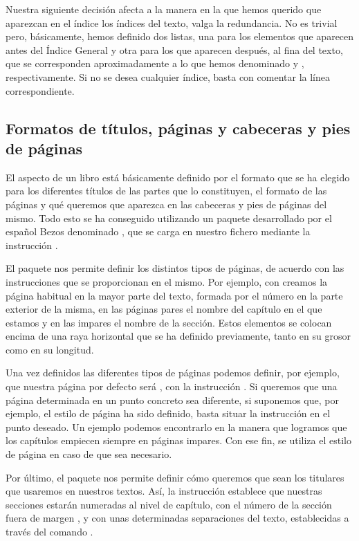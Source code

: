 Nuestra siguiente decisión afecta a la manera en la que hemos querido que aparezcan en el índice los índices del texto, valga la redundancia. No es trivial pero, básicamente, hemos definido dos listas, una para los elementos que aparecen antes del Índice General y otra para los  que aparecen después, al fina del texto, que se corresponden aproximadamente a lo que hemos denominado  y , respectivamente. Si no se desea cualquier índice, basta con comentar la línea correspondiente.

\subsection{Formatos de títulos, páginas y cabeceras y pies de páginas}
El aspecto de un libro está básicamente definido por el formato que se ha elegido para los diferentes títulos de las partes que lo constituyen, el formato de las páginas y qué queremos que aparezca en las cabeceras y pies de páginas del mismo. Todo esto se ha conseguido utilizando un paquete desarrollado por el español Bezos denominado , que se carga en nuestro fichero mediante la instrucción .

El paquete nos permite definir los distintos tipos de páginas, de acuerdo con las instrucciones que se proporcionan en el mismo. Por ejemplo, con  creamos la página habitual en la mayor parte del texto, formada por el número en la parte exterior de la misma, en las páginas pares el nombre del capítulo en el que estamos y en las impares el nombre de la sección. Estos elementos se colocan encima de una raya horizontal que se ha definido previamente, tanto en su grosor como en su longitud.

Una vez definidos las diferentes tipos de páginas podemos definir, por ejemplo, que nuestra página por defecto será , con la instrucción . Si queremos que una página determinada en un punto concreto sea diferente, si suponemos que, por ejemplo, el estilo de página  ha sido definido, basta situar la instrucción  en el punto deseado. Un ejemplo podemos encontrarlo en la manera que logramos que los capítulos empiecen siempre en páginas impares. Con ese fin, se utiliza el estilo de página  en caso de que sea necesario.

Por último, el paquete  nos permite definir cómo queremos que sean los titulares que usaremos en nuestros textos. Así,  la instrucción  establece que nuestras secciones estarán numeradas al nivel de capítulo, con el número de la sección fuera de margen , y con unas determinadas separaciones del texto, establecidas a través del comando . 

